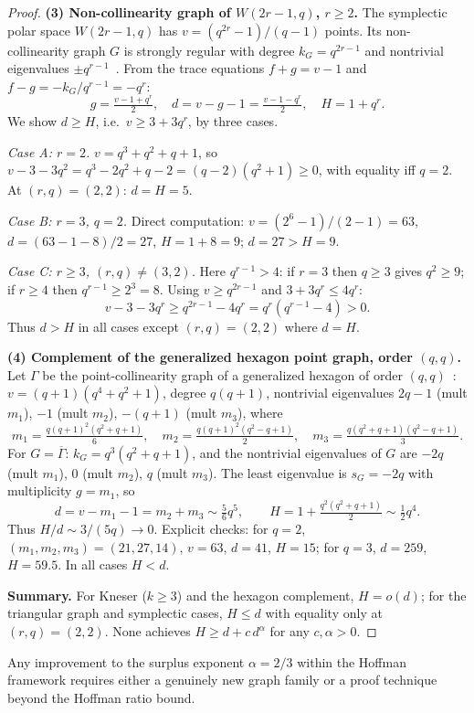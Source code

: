 \begin{proof}
\textbf{(3) Non-collinearity graph of $W(2r-1,q)$, $r\ge 2$.}
The symplectic polar space $W(2r-1,q)$ has $v=(q^{2r}-1)/(q-1)$ points.  Its non-collinearity graph $G$ is strongly regular with degree $k_G=q^{2r-1}$ and nontrivial eigenvalues $\pm q^{r-1}$~\cite{BvM2022}.  From the trace equations $f+g=v-1$ and $f-g=-k_G/q^{r-1}=-q^r$:
\[
  g = \tfrac{v-1+q^r}{2},\quad d = v-g-1 = \tfrac{v-1-q^r}{2},\quad
  H = 1 + q^r.
\]
We show $d\ge H$, i.e.\ $v\ge 3+3q^r$, by three cases.

\textit{Case A: $r=2$.}
$v = q^3+q^2+q+1$, so $v-3-3q^2 = q^3-2q^2+q-2 = (q-2)(q^2+1)\ge 0$,
with equality iff $q=2$.  At $(r,q)=(2,2)$: $d=H=5$.

\textit{Case B: $r=3$, $q=2$.}
Direct computation: $v=(2^6-1)/(2-1)=63$, $d=(63-1-8)/2=27$, $H=1+8=9$; $d=27 > H=9$.

\textit{Case C: $r\ge 3$, $(r,q)\ne(3,2)$.}
Here $q^{r-1}>4$: if $r=3$ then $q\ge 3$ gives $q^2\ge 9$; if $r\ge 4$ then $q^{r-1}\ge 2^3=8$.  Using $v\ge q^{2r-1}$ and $3+3q^r\le 4q^r$:
\[
  v-3-3q^r \ge q^{2r-1}-4q^r = q^r(q^{r-1}-4) > 0.
\]
Thus $d > H$ in all cases except $(r,q)=(2,2)$ where $d=H$.

\textbf{(4) Complement of the generalized hexagon point graph, order $(q,q)$.}
Let $\Gamma$ be the point-collinearity graph of a generalized hexagon of order $(q,q)$~\cite{BvM2022}: $v=(q+1)(q^4+q^2+1)$, degree $q(q+1)$, nontrivial eigenvalues $2q-1$ (mult $m_1$), $-1$ (mult $m_2$), $-(q+1)$ (mult $m_3$), where
\[
  m_1 = \tfrac{q(q+1)^2(q^2+q+1)}{6},\quad
  m_2 = \tfrac{q(q+1)^2(q^2-q+1)}{2},\quad
  m_3 = \tfrac{q(q^2+q+1)(q^2-q+1)}{3}.
\]
For $G=\overline{\Gamma}$: $k_G = q^3(q^2+q+1)$, and the nontrivial eigenvalues of $G$ are $-2q$ (mult $m_1$), $0$ (mult $m_2$), $q$ (mult $m_3$).  The least eigenvalue is $s_G=-2q$ with multiplicity $g=m_1$, so
\[
  d = v - m_1 - 1 = m_2 + m_3 \sim \tfrac56q^5,
  \qquad
  H = 1 + \tfrac{q^2(q^2+q+1)}{2} \sim \tfrac12q^4.
\]
Thus $H/d \sim 3/(5q)\to 0$.  Explicit checks: for $q=2$, $(m_1,m_2,m_3)=(21,27,14)$, $v=63$, $d=41$, $H=15$; for $q=3$, $d=259$, $H=59.5$.  In all cases $H < d$.

\medskip
\textbf{Summary.}  For Kneser ($k\ge 3$) and the hexagon complement, $H=o(d)$; for the triangular graph and symplectic cases, $H\le d$ with equality only at $(r,q)=(2,2)$.  None achieves $H\ge d+c\,d^\alpha$ for any $c,\alpha>0$.
\end{proof}

\begin{remark}
Any improvement to the surplus exponent $\alpha=2/3$ within the Hoffman framework requires either a genuinely new graph family or a proof technique beyond the Hoffman ratio bound.
\end{remark}
